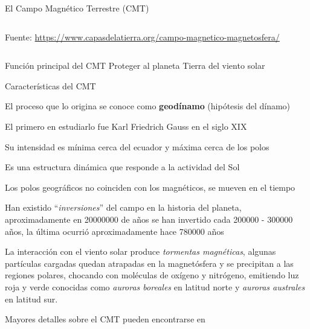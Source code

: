 \begin{frame}{El Campo Magn\'etico Terrestre (CMT)}
\begin{columns}
\begin{column}{0.7\textwidth}
    {\tiny Fuente: \url{https://www.capasdelatierra.org/campo-magnetico-magnetosfera/}}
    \end{column}
  \end{columns}
\end{frame}


\begin{frame}

  \begin{exampleblock}{Funci\'on principal del CMT }
    Proteger al planeta Tierra del viento solar
  \end{exampleblock}

  \begin{block}{Caracter\'isticas del CMT}
    \begin{itemize}{\small
    \item El proceso que lo origina se conoce como {\bf geod\'inamo} (hip\'otesis del d\'inamo)
    \item El primero en estudiarlo fue Karl Friedrich Gauss en el siglo XIX
    \item Su intensidad es m\'inima cerca del ecuador y m\'axima cerca de los polos
    \item Es una estructura din\'amica que responde a la actividad del Sol
    \item Los polos geogr\'aficos no coinciden con los magn\'eticos, se mueven en el tiempo
    \item Han existido ``{\it inversiones}'' del campo en la historia del planeta, aproximadamente
      en 20000000 de a\~nos se han invertido cada 200000 - 300000 a\~nos, la \'ultima ocurri\'o
      aproximadamente hace 780000 a\~nos
    \item La interacci\'on con el viento solar produce {\it tormentas magn\'eticas}, algunas
      part\'iculas cargadas quedan atrapadas en la magnet\'osfera y se precipitan a las regiones polares,
      chocando con mol\'eculas de ox\'igeno y nitr\'ogeno, emitiendo luz roja y verde conocidas
      como {\it auroras boreales} en latitud norte y {\it auroras australes} en latitud sur.
}
    \end{itemize}
  \end{block}\vspace{0.3mm}

{\footnotesize
Mayores detalles sobre el CMT pueden encontrarse en 
\href{https://es.gizmodo.com/como-funciona-el-campo-magnetico-de-la-tierra-en-seis-1792481678}{}
}

\end{frame}


